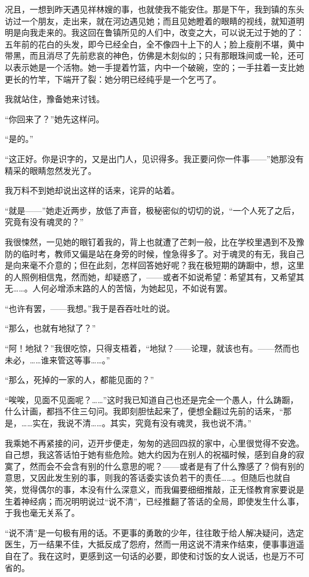 \par 况且，一想到昨天遇见祥林嫂的事，也就使我不能安住。那是下午，我到镇的东头访过一个朋友，走出来，就在河边遇见她；而且见她瞪着的眼睛的视线，就知道明明是向我走来的。我这回在鲁镇所见的人们中，改变之大，可以说无过于她的了：五年前的花白的头发，即今已经全白，全不像四十上下的人；脸上瘦削不堪，黄中带黑，而且消尽了先前悲哀的神色，仿佛是木刻似的；只有那眼珠间或一轮，还可以表示她是一个活物。她一手提着竹篮，内中一个破碗，空的；一手拄着一支比她更长的竹竿，下端开了裂：她分明已经纯乎是一个乞丐了。
\par 我就站住，豫备她来讨钱。
\par “你回来了？”她先这样问。
\par “是的。”
\par “这正好。你是识字的，又是出门人，见识得多。我正要问你一件事——”她那没有精采的眼睛忽然发光了。
\par 我万料不到她却说出这样的话来，诧异的站着。
\par “就是——”她走近两步，放低了声音，极秘密似的切切的说，“一个人死了之后，究竟有没有魂灵的？”
\par 我很悚然，一见她的眼钉着我的，背上也就遭了芒刺一般，比在学校里遇到不及豫防的临时考，教师又偏是站在身旁的时候，惶急得多了。对于魂灵的有无，我自己是向来毫不介意的；但在此刻，怎样回答她好呢？我在极短期的踌蹰中，想，这里的人照例相信鬼，然而她，却疑惑了，——或者不如说希望：希望其有，又希望其无……。人何必增添末路的人的苦恼，为她起见，不如说有罢。
\par “也许有罢，——我想。”我于是吞吞吐吐的说。
\par “那么，也就有地狱了？”
\par “阿！地狱？”我很吃惊，只得支梧着，“地狱？——论理，就该也有。——然而也未必，……谁来管这等事……。”
\par “那么，死掉的一家的人，都能见面的？”
\par “唉唉，见面不见面呢？……”这时我已知道自己也还是完全一个愚人，什么踌蹰，什么计画，都挡不住三句问。我即刻胆怯起来了，便想全翻过先前的话来，“那是，……实在，我说不清……。其实，究竟有没有魂灵，我也说不清。”
\par 我乘她不再紧接的问，迈开步便走，匆匆的逃回四叔的家中，心里很觉得不安逸。自己想，我这答话怕于她有些危险。她大约因为在别人的祝福时候，感到自身的寂寞了，然而会不会含有别的什么意思的呢？——或者是有了什么豫感了？倘有别的意思，又因此发生别的事，则我的答话委实该负若干的责任……。但随后也就自笑，觉得偶尔的事，本没有什么深意义，而我偏要细细推敲，正无怪教育家要说是生着神经病；而况明明说过“说不清”，已经推翻了答话的全局，即使发生什么事，于我也毫无关系了。
\par “说不清”是一句极有用的话。不更事的勇敢的少年，往往敢于给人解决疑问，选定医生，万一结果不佳，大抵反成了怨府，然而一用这说不清来作结束，便事事逍遥自在了。我在这时，更感到这一句话的必要，即使和讨饭的女人说话，也是万不可省的。
